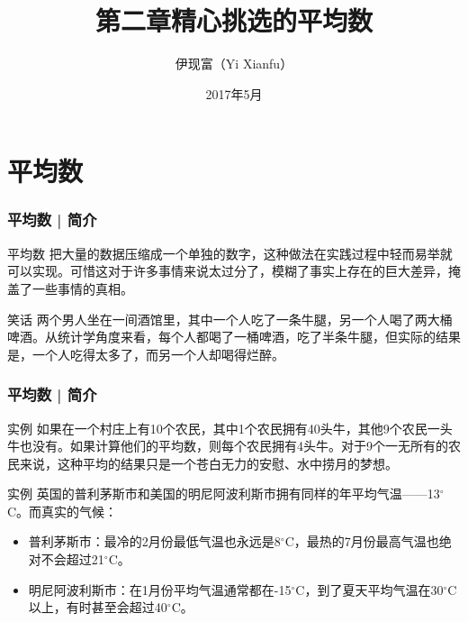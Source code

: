 



\title[平均数]{第二章\quad 精心挑选的平均数}
\author[Yixf]{伊现富（Yi Xianfu）}
\date{2017年5月}



\section{平均数}
\begin{frame}
  \frametitle{平均数 | 简介}
  \begin{block}{平均数}
把大量的数据压缩成一个单独的数字，这种做法在实践过程中轻而易举就可以实现。可惜这对于许多事情来说太过分了，模糊了事实上存在的巨大差异，掩盖了一些事情的真相。
  \end{block}
  \pause
  \begin{block}{笑话}
两个男人坐在一间酒馆里，其中一个人吃了一条牛腿，另一个人喝了两大桶啤酒。从统计学角度来看，每个人都喝了一桶啤酒，吃了半条牛腿，但实际的结果是，一个人吃得太多了，而另一个人却喝得烂醉。
  \end{block}
\end{frame}

\begin{frame}
  \frametitle{平均数 | 简介}
  \begin{block}{实例}
如果在一个村庄上有10个农民，其中1个农民拥有40头牛，其他9个农民一头牛也没有。如果计算他们的平均数，则每个农民拥有4头牛。对于9个一无所有的农民来说，这种平均的结果只是一个苍白无力的安慰、水中捞月的梦想。
  \end{block}
  \pause
  \begin{block}{实例}
    英国的普利茅斯市和美国的明尼阿波利斯市拥有同样的年平均气温——13$^{\circ}$C。而真实的气候：
    \begin{itemize}
      \item 普利茅斯市：最冷的2月份最低气温也永远是8$^{\circ}$C，最热的7月份最高气温也绝对不会超过21$^{\circ}$C。
      \item 明尼阿波利斯市：在1月份平均气温通常都在-15$^{\circ}$C，到了夏天平均气温在30$^{\circ}$C以上，有时甚至会超过40$^{\circ}$C。
    \end{itemize}
  \end{block}
\end{frame}

